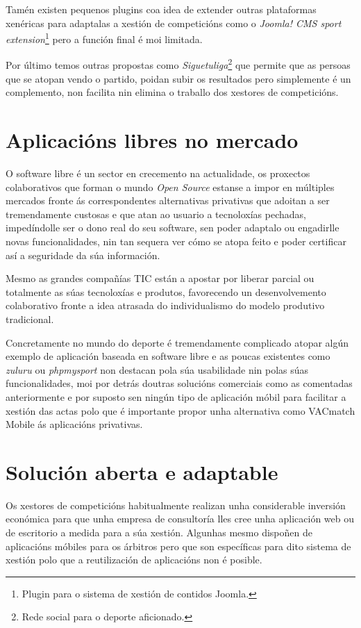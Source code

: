     Tamén existen pequenos plugins coa idea de extender outras plataformas 
xenéricas para adaptalas a xestión de competicións como o \emph{Joomla! CMS 
sport extension}\footnote{Plugin para o sistema de xestión de contidos Joomla.} 
pero a función final é moi limitada.

    Por último temos outras propostas como \emph{Siguetuliga}\footnote{Rede 
social para o deporte aficionado.} que permite que as persoas que se atopan 
vendo o partido, poidan subir os resultados pero simplemente é un complemento, 
non facilita nin elimina o traballo dos xestores de competicións.

  \section{Aplicacións libres no mercado}

    O software libre é un sector en crecemento na actualidade, os proxectos 
colaborativos que forman o mundo \emph{Open Source} estanse a impor en múltiples 
mercados fronte ás correspondentes alternativas privativas que adoitan a ser 
tremendamente custosas e que atan ao usuario a tecnoloxías pechadas, 
impedíndolle ser o dono real do seu software, sen poder adaptalo ou engadirlle 
novas funcionalidades, nin tan sequera ver cómo se atopa feito e poder 
certificar así a seguridade da súa información.

    Mesmo as grandes compañías TIC están a apostar por liberar parcial ou totalmente as 
súas tecnoloxías e produtos, favorecendo un desenvolvemento colaborativo fronte 
a idea atrasada do individualismo do modelo produtivo tradicional.

    Concretamente no mundo do deporte é tremendamente complicado atopar algún 
exemplo de aplicación baseada en software libre e as poucas existentes como 
\emph{zuluru} ou \emph{phpmysport} non destacan pola súa usabilidade nin polas 
súas funcionalidades, moi por detrás doutras solucións comerciais como as 
comentadas anteriormente e por suposto sen ningún tipo de aplicación móbil 
para facilitar a xestión das actas polo que é importante propor unha 
alternativa como VACmatch Mobile ás aplicacións privativas.

  \section{Solución aberta e adaptable}
  Os xestores de competicións habitualmente realizan unha considerable inversión 
económica para que unha empresa de consultoría lles cree unha aplicación web ou de 
escritorio a medida para a súa xestión. Algunhas mesmo dispoñen de aplicacións móbiles 
para os árbitros pero que son específicas para dito sistema de xestión polo que a 
reutilización de aplicacións non é posible.


